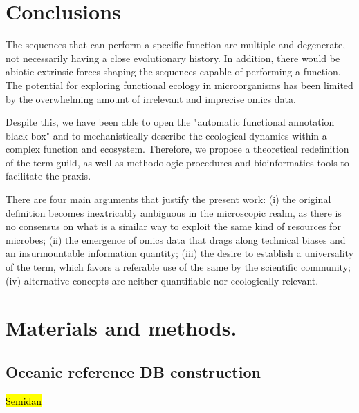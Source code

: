 \documentclass[Journal,letterpaper,NoLists]{ascelike-new}
\begin{document}
\section{Conclusions}


The sequences that can perform a specific function are multiple and degenerate, not necessarily having a close evolutionary history. In addition, there would be abiotic extrinsic forces shaping the sequences capable of performing a function. The potential for exploring functional ecology in microorganisms has been limited by the overwhelming amount of irrelevant and imprecise omics data.

Despite this, we have been able to open the "automatic functional annotation black-box" and to mechanistically describe the ecological dynamics within a complex function and ecosystem. Therefore, we propose a theoretical redefinition of the term guild, as well as methodologic procedures and bioinformatics tools to facilitate the praxis. 

There are four main arguments that justify the present work: (i) the original definition becomes inextricably ambiguous in the microscopic realm, as there is no consensus on what is a similar way to exploit the same kind of resources for microbes; (ii) the emergence of omics data that drags along technical biases and an insurmountable information quantity; (iii) the desire to establish a universality of the term, which favors a referable use of the same by the scientific community; (iv) alternative concepts are neither quantifiable nor ecologically relevant.







\section{Materials and methods.}

\subsection{Oceanic reference DB construction}

\hl{Semidan}
\end{document}
